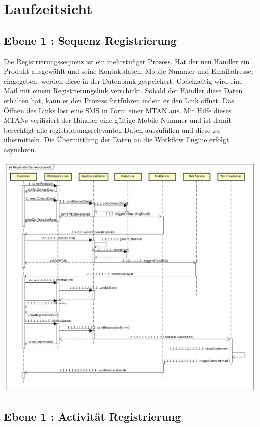 \graphicspath{{./images/}}

\chapter{Laufzeitsicht}

\section{Ebene 1 : Sequenz Registrierung}

Die Registrierungssequenz ist ein mehrstufiger Prozess. Hat der neu Händler ein Produkt ausgewählt und seine Kontaktdaten, Mobile-Nummer und Emailadresse, eingegeben, werden diese in der Datenbank gespeichert. Gleichzeitig wird eine Mail mit einem Registrierungslink verschickt. Sobald der Händler diese Daten erhalten hat, kann er den Prozess fortführen indem er den Link öffnet. Das Öffnen des Links löst eine SMS in Form einer MTAN aus. Mit Hilfe dieses MTANs verifiziert der Händler eine gültige Mobile-Nummer und ist damit berechtigt alle registrierungsrelevanten Daten auszufüllen und diese zu übermitteln. Die Übermittlung der Daten an die Workflow Engine erfolgt asynchron.
\begin{center}
	\includegraphics[scale=0.44]{RegistrationSequenceLevel1.png}
\end{center}
\newpage

\section{Ebene 1 : Activität Registrierung}

